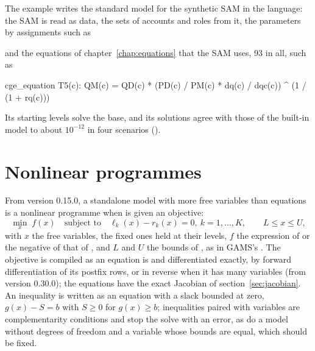 The example  writes the standard model for
the synthetic SAM in the language: the SAM is read as data, the sets of
accounts and roles from it, the parameters by assignments such as
and the equations of chapter~\ref{chap:equations} that the SAM uses, 93 in
all, such as
\begin{stcode}
cge_equation T5(c): QM(c) = QD(c) * (PD(c) / PM(c) * dq(c) / dqc(c)) ^ (1 / (1 + rq(c)))
\end{stcode}
Its starting levels solve the base, and its solutions agree with those of
the built-in model to about $10^{-12}$ in four scenarios
().

\section{Nonlinear programmes}\label{sec:nlp}

From version 0.15.0, a standalone model with more free variables than
equations is a nonlinear programme when  is given an
objective:
\begin{equation*}
\min_x\; f(x) \quad\text{subject to}\quad \ell_k(x) - r_k(x) = 0,\ k = 1,
\dots, K, \qquad L \le x \le U,
\end{equation*}
with $x$ the free variables, the fixed ones held at their levels, $f$ the
expression of  or the negative of that of ,
and $L$ and $U$ the bounds of ,
as in GAMS's . The objective is compiled
as an equation is and differentiated exactly, by forward differentiation of
its postfix rows, or in reverse when it has many variables (from version
0.30.0); the equations have the exact Jacobian of
section~\ref{sec:jacobian}. An inequality is written as an equation with a
slack bounded at zero, $g(x) - S = b$ with $S $ for $g(x) \ge b$;
inequalities paired with variables are complementarity conditions and stop
the solve with an error, as do a model without degrees of freedom and a
variable whose bounds are equal, which should be fixed.

